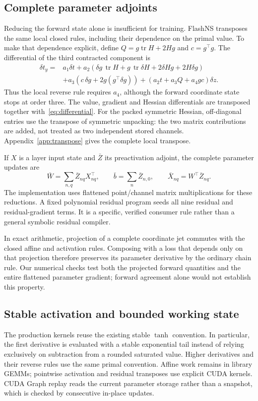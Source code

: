 \documentclass[11pt]{article}
\begin{document}
\subsection{Complete parameter adjoints}
Reducing the forward state alone is insufficient for training. FlashNS
transposes the same local closed rules, including their dependence on
the primal value. To make that dependence explicit, define
$Q=g\operatorname{tr}H+2Hg$ and $c=g^\top g$. The differential of the
third contracted component is
\begin{align}
\delta t_y={}&a_1\delta t+
a_2\left(\delta g\,\operatorname{tr}H+
g\,\operatorname{tr}\delta H+2\delta H g+2H\delta g\right)\nonumber\\
&+a_3\left(c\,\delta g+2g(g^\top\delta g)\right)
+\left(a_2t+a_3Q+a_4gc\right)\delta z.
\label{eq:differential}
\end{align}
Thus the local reverse rule requires $a_4$, although the forward
coordinate state stops at order three. The value, gradient and Hessian
differentials are transposed together with~\eqref{eq:differential}.
For the packed symmetric Hessian, off-diagonal entries use the transpose
of symmetric unpacking: the two matrix contributions are added, not
treated as two independent stored channels. Appendix~\ref{app:transpose}
gives the complete local transpose.

If $X$ is a layer input state and $\bar Z$ its preactivation adjoint,
the complete parameter updates are
\begin{equation}
\bar W=\sum_{n,q}\bar Z_{nq}X_{nq}^{\top},
\qquad \bar b=\sum_n\bar Z_{n,0},\qquad
\bar X_{nq}=W^\top\bar Z_{nq}.
\end{equation}
The implementation uses flattened point/channel matrix multiplications
for these reductions. A fixed polynomial residual program seeds all nine
residual and residual-gradient terms. It is a specific, verified consumer
rule rather than a general symbolic residual compiler.

In exact arithmetic, projection of a complete coordinate jet commutes
with the closed affine and activation rules. Composing with a loss that
depends only on that projection therefore preserves its parameter
derivative by the ordinary chain rule. Our numerical checks test both
the projected forward quantities and the entire flattened parameter
gradient; forward agreement alone would not establish this property.

\subsection{Stable activation and bounded working state}
The production kernels reuse the existing stable $\tanh$ convention.
In particular, the first derivative is evaluated with a stable
exponential tail instead of relying exclusively on subtraction from a
rounded saturated value. Higher derivatives and their reverse rules use
the same primal convention. Affine work remains in library GEMMs;
pointwise activation and residual transposes use explicit CUDA kernels.
CUDA Graph replay reads the current parameter storage rather than a
snapshot, which is checked by consecutive in-place updates.
\end{document}
